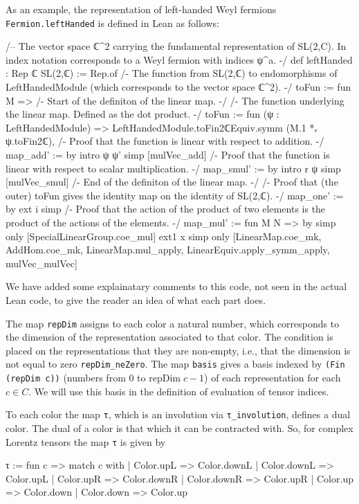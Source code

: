 \documentclass[a4paper, 11pt]{article}
\begin{document}
As an example, the representation of left-handed Weyl fermions  \lstinline|Fermion.leftHanded|
is defined in Lean as follows:
\begin{codeLong}
/-- The vector space ℂ^2 carrying the fundamental representation of SL(2,C).
  In index notation corresponds to a Weyl fermion with indices ψ^a. -/
def leftHanded : Rep ℂ SL(2,ℂ) := Rep.of {
  /- The function from SL(2,ℂ) to endomorphisms of LeftHandedModule 
    (which corresponds to the vector space ℂ^2). -/
  toFun := fun M => {
    /- Start of the definiton of the linear map. -/
    /- The function underlying the linear map. Defined as the dot product. -/
    toFun := fun (ψ : LeftHandedModule) =>
      LeftHandedModule.toFin2ℂEquiv.symm (M.1 *ᵥ ψ.toFin2ℂ),
    /- Proof that the function is linear with respect to addition. -/
    map_add' := by
      intro ψ ψ'
      simp [mulVec_add]
    /- Proof that the function is linear with respect to scalar multiplication. -/
    map_smul' := by
      intro r ψ
      simp [mulVec_smul]
    /- End of the definiton of the linear map. -/}
  /- Proof that (the outer) toFun gives the identity map on the identity of SL(2,ℂ). -/
  map_one' := by
    ext i
    simp
  /- Proof that the action of the product of two elements is 
    the product of the actions of the elements. -/
  map_mul' := fun M N => by
    simp only [SpecialLinearGroup.coe_mul]
    ext1 x
    simp only [LinearMap.coe_mk, AddHom.coe_mk, LinearMap.mul_apply, LinearEquiv.apply_symm_apply,
      mulVec_mulVec]}
\end{codeLong} 
We have added some explainatary comments to this code, not seen in the actual Lean code, to give 
the reader an idea of what each part does. 

The map \lstinline|repDim| assigns to each color a natural number, which corresponds 
to the dimension of the representation associated to that color. The condition is placed on 
the representations that they are non-empty, i.e., that the dimension is not equal to zero \lstinline|repDim_neZero|.  
The map \lstinline|basis| gives a basis indexed by \lstinline|(Fin (repDim c))| (numbers from 0 to $\mathrm{repDim}\; c -1 $)  of each representation for each $c \in C$.  
We will use this basis in the definition of evaluation of tensor indices. 

To each color the map \lstinline|τ|, which is an involution via \lstinline|τ_involution|, defines 
a dual color. The dual of a color is that which it can be contracted with. So, for complex Lorentz tensors 
the map \lstinline|τ| is given by 
\begin{code} 
τ := fun c =>
  match c with
  | Color.upL => Color.downL
  | Color.downL => Color.upL
  | Color.upR => Color.downR
  | Color.downR => Color.upR
  | Color.up => Color.down
  | Color.down => Color.up
\end{code}
\end{document}
